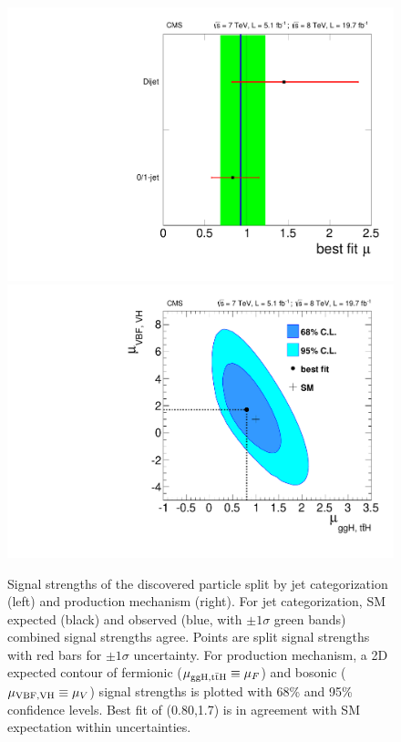 \begin{figure}[htbp]
\begin{center}
\includegraphics[width=.45\linewidth]{HiggsDiscovery/figures/mu_bestfit_bycategory.pdf}
\includegraphics[width=.45\linewidth]{HiggsDiscovery/figures/RVRF.pdf}
\caption[Signal Strengths of the Discovered Particle Split By Jet Categorization and Production Mechanism]{Signal strengths of the discovered particle split by jet categorization (left) and production mechanism (right). For jet categorization, SM expected (black) and observed (blue, with $\pm1\sigma$ green bands) combined signal strengths agree. Points are split signal strengths with red bars for $\pm1\sigma$ uncertainty. For production mechanism, a 2D expected contour of fermionic ($\mu_{\rm{ggH,t\bar{t}H}}\equiv\mu_F$) and bosonic ($\mu_{\rm{VBF,VH}}\equiv\mu_V$) signal strengths is plotted with 68\% and 95\% confidence levels. Best fit of (0.80,1.7) is in agreement with SM expectation within uncertainties.}
\label{fig:SignalStrengths}
\end{center}
\end{figure}

